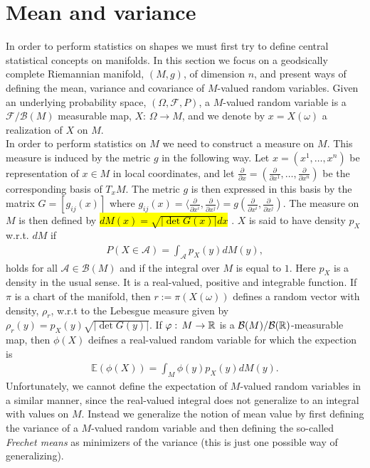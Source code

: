 \section*{Mean and variance}
\label{sec:mean_and_variance}

In order to perform statistics on shapes we must first try to define central statistical concepts on manifolds. In this section we focus on a geodsically complete Riemannian manifold, $(M, g)$, of dimension $n$, and present ways of defining the mean, variance and covariance of $M$-valued random variables. Given an underlying probability space, $(\Omega, \mathcal{F}, P)$, a $M$-valued random variable is a $\mathcal{F}/\mathcal{B}(M)$ measurable map, $X: \, \Omega \rightarrow M$, and we denote by $x = X(\omega)$ a realization of $X$ on $M$.\\[0.2 cm]
In order to perform statistics on $M$ we need to construct a measure on $M$. This measure is induced by the metric $g$ in the following way. Let $x = (x^1, \ldots , x^n)$ be representation of $x \in M$ in local coordinates, and let $\frac{\partial}{\partial x} = (\frac{\partial}{\partial x^1}, \ldots , \frac{\partial}{\partial x^n})$ be the corresponding basis of $T_x M$. The metric $g$ is then expressed in this basis by the matrix $G = [g_{ij}(x)]$ where $g_{ij}(x) = \langle \frac{\partial}{\partial x^i} , \frac{\partial}{\partial x^j} \rangle = g\left(\frac{\partial}{\partial x^i}, \frac{\partial}{\partial x^j}\right)$. The measure on $M$ is then defined by \hl{ $d M(x) = \sqrt{\left| \det G(x) \right|} dx$ }. $X$ is said to have density $p_X$ w.r.t. $d M$ if
\begin{align*}
P(X \in \mathcal{A}) = \int_{\mathcal{A}} p_X(y) d M(y),
\end{align*}
holds for all $\mathcal{A} \in \mathcal{B}(M)$ and if the integral over $M$ is equal to $1$. Here
$p_X$ is a density in the usual sense. It is a real-valued, positive and integrable function. If $\pi$ is a chart of the manifold, then $r := \pi(X(\omega))$ defines a random vector with density, $\rho_r$, w.r.t to the Lebesgue measure given by $\rho_r (y) = p_X (y) \sqrt{\left| \det G(y) \right|}$. If $\varphi: \, M \rightarrow \mathbb{R}$ is a $\mathcal{B}(M)/ \mathcal{B}(\mathbb{R})$-measurable map, then $\phi(X)$ deifnes a real-valued random variable for which the expection is
\begin{align*}
\mathbb{E} (\phi(X)) = \int_M \phi(y) p_X(y) d M(y).
\end{align*}
Unfortunately, we cannot define the expectation of $M$-valued random variables in a similar manner, since the real-valued integral does not generalize to an integral with values on $M$. Instead we generalize the notion of mean value by first defining the variance of a $M$-valued random variable and then defining the so-called \textit{Frechet means} as minimizers of the variance (this is just one possible way of generalizing). 

